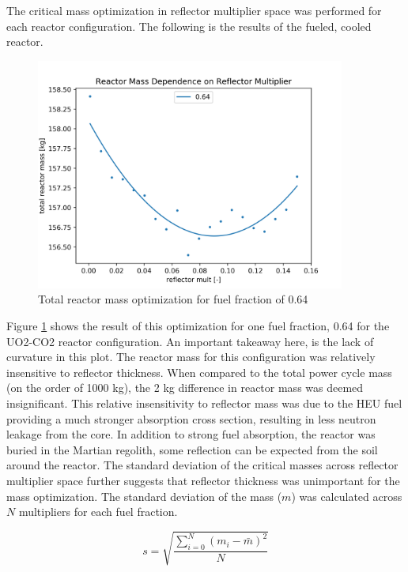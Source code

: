 The critical mass optimization in reflector multiplier space was performed for
each reactor configuration. The following is the results of the \uox fueled,
\codiox cooled reactor.

\begin{figure}[h]
    \centering
    \includegraphics[width=4in]{../images/mass_mult_064.png}
\caption{Total reactor mass optimization for fuel fraction of 0.64}
\label{fig:mass_mult_one}
\end{figure}

Figure \ref{fig:mass_mult_one} shows the result of this optimization for one
fuel fraction, 0.64 for the UO2-CO2 reactor configuration. An important takeaway here, is the lack of curvature in
this plot. The reactor mass for this configuration was relatively insensitive to
reflector thickness. When compared to the total power cycle mass (on the order
of 1000 kg), the 2 kg difference in reactor mass was deemed insignificant.
This relative insensitivity to reflector mass was due to the HEU fuel providing a much
stronger absorption cross section, resulting in less neutron leakage from the core. In
addition to strong fuel absorption, the reactor was buried in the Martian
regolith, some reflection can be expected from the soil around the reactor.
The standard deviation of the critical masses across reflector multiplier space
further suggests that reflector thickness was unimportant for the mass
optimization. The standard deviation of the mass ($m$) was calculated across $N$
multipliers for each fuel fraction.

\begin{equation}
    s = \sqrt{\frac{\sum_{i=0}^{N}(m_i - \bar{m})^2 }{N}}
\end{equation}

